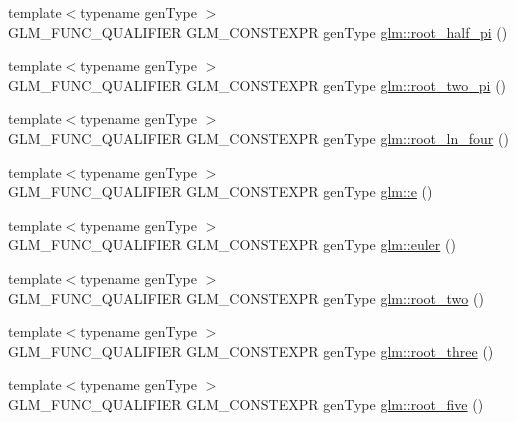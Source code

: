 \begin{DoxyCompactItemize}
\item 
{\footnotesize template$<$typename gen\+Type $>$ }\\G\+L\+M\+\_\+\+F\+U\+N\+C\+\_\+\+Q\+U\+A\+L\+I\+F\+I\+ER G\+L\+M\+\_\+\+C\+O\+N\+S\+T\+E\+X\+PR gen\+Type \hyperlink{group__gtc__constants_ga4e276cb823cc5e612d4f89ed99c75039}{glm\+::root\+\_\+half\+\_\+pi} ()
\item 
{\footnotesize template$<$typename gen\+Type $>$ }\\G\+L\+M\+\_\+\+F\+U\+N\+C\+\_\+\+Q\+U\+A\+L\+I\+F\+I\+ER G\+L\+M\+\_\+\+C\+O\+N\+S\+T\+E\+X\+PR gen\+Type \hyperlink{group__gtc__constants_ga2bcedc575039fe0cd765742f8bbb0bd3}{glm\+::root\+\_\+two\+\_\+pi} ()
\item 
{\footnotesize template$<$typename gen\+Type $>$ }\\G\+L\+M\+\_\+\+F\+U\+N\+C\+\_\+\+Q\+U\+A\+L\+I\+F\+I\+ER G\+L\+M\+\_\+\+C\+O\+N\+S\+T\+E\+X\+PR gen\+Type \hyperlink{group__gtc__constants_ga4129412e96b33707a77c1a07652e23e2}{glm\+::root\+\_\+ln\+\_\+four} ()
\item 
{\footnotesize template$<$typename gen\+Type $>$ }\\G\+L\+M\+\_\+\+F\+U\+N\+C\+\_\+\+Q\+U\+A\+L\+I\+F\+I\+ER G\+L\+M\+\_\+\+C\+O\+N\+S\+T\+E\+X\+PR gen\+Type \hyperlink{group__gtc__constants_ga4b7956eb6e2fbedfc7cf2e46e85c5139}{glm\+::e} ()
\item 
{\footnotesize template$<$typename gen\+Type $>$ }\\G\+L\+M\+\_\+\+F\+U\+N\+C\+\_\+\+Q\+U\+A\+L\+I\+F\+I\+ER G\+L\+M\+\_\+\+C\+O\+N\+S\+T\+E\+X\+PR gen\+Type \hyperlink{group__gtc__constants_gad8fe2e6f90bce9d829e9723b649fbd42}{glm\+::euler} ()
\item 
{\footnotesize template$<$typename gen\+Type $>$ }\\G\+L\+M\+\_\+\+F\+U\+N\+C\+\_\+\+Q\+U\+A\+L\+I\+F\+I\+ER G\+L\+M\+\_\+\+C\+O\+N\+S\+T\+E\+X\+PR gen\+Type \hyperlink{group__gtc__constants_ga74e607d29020f100c0d0dc46ce2ca950}{glm\+::root\+\_\+two} ()
\item 
{\footnotesize template$<$typename gen\+Type $>$ }\\G\+L\+M\+\_\+\+F\+U\+N\+C\+\_\+\+Q\+U\+A\+L\+I\+F\+I\+ER G\+L\+M\+\_\+\+C\+O\+N\+S\+T\+E\+X\+PR gen\+Type \hyperlink{group__gtc__constants_ga4f286be4abe88be1eed7d2a9f6cb193e}{glm\+::root\+\_\+three} ()
\item 
{\footnotesize template$<$typename gen\+Type $>$ }\\G\+L\+M\+\_\+\+F\+U\+N\+C\+\_\+\+Q\+U\+A\+L\+I\+F\+I\+ER G\+L\+M\+\_\+\+C\+O\+N\+S\+T\+E\+X\+PR gen\+Type \hyperlink{group__gtc__constants_gae9ebbded75b53d4faeb1e4ef8b3347a2}{glm\+::root\+\_\+five} ()

\end{DoxyCompactItemize}
